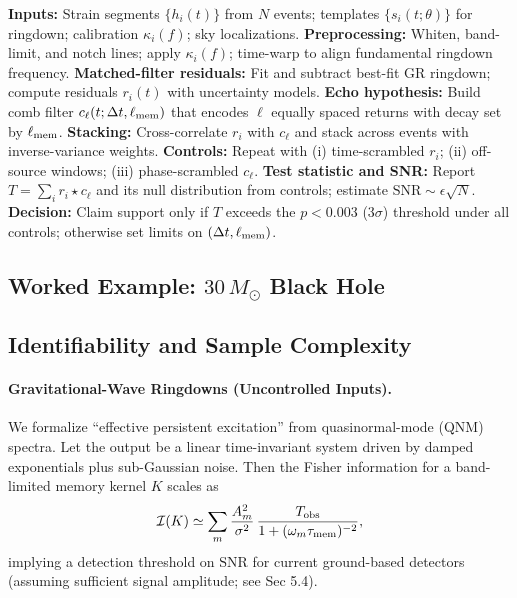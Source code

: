 \documentclass[a4paper,11pt]{article}
\theoremstyle{plain}
\theoremstyle{definition}
\theoremstyle{remark}
\begin{document}
\begin{algorithm}[tbp]
\caption{Echo-stacking protocol with nuisance controls}
\label{alg:echo-stack}
\begin{algorithmic}[1]
\State \textbf{Inputs:} Strain segments $\{h_i(t)\}$ from $N$ events; templates $\{s_i(t;\theta)\}$ for ringdown; calibration $\kappa_i(f)$; sky localizations.
\State \textbf{Preprocessing:} Whiten, band-limit, and notch lines; apply $\kappa_i(f)$; time-warp to align fundamental ringdown frequency.
\State \textbf{Matched-filter residuals:} Fit and subtract best-fit GR ringdown; compute residuals $r_i(t)$ with uncertainty models.
\State \textbf{Echo hypothesis:} Build comb filter $c_\ell(t;\Delta t,\ell_{\rm mem})$ that encodes $\ell$ equally spaced returns with decay set by $\ell_{\rm mem}$.
\State \textbf{Stacking:} Cross-correlate $r_i$ with $c_\ell$ and stack across events with inverse-variance weights.
\State \textbf{Controls:} Repeat with (i) time-scrambled $r_i$; (ii) off-source windows; (iii) phase-scrambled $c_\ell$.
\State \textbf{Test statistic and SNR:} Report $T=\sum_i r_i\star c_\ell$ and its null distribution from controls; estimate $\mathrm{SNR}\sim \epsilon\sqrt{N}$.
\State \textbf{Decision:} Claim support only if $T$ exceeds the $p<0.003$ (3$\sigma$) threshold under all controls; otherwise set limits on $(\Delta t,\ell_{\rm mem})$.
\end{algorithmic}
\end{algorithm}


\subsection{Worked Example: \texorpdfstring{$30\,M_\odot$}{30 solar-mass} Black Hole}

\subsection{Identifiability and Sample Complexity}

\paragraph{Gravitational-Wave Ringdowns (Uncontrolled Inputs).}
We formalize ``effective persistent excitation'' from quasinormal-mode (QNM) spectra. Let the output be a linear time-invariant system driven by damped exponentials plus sub-Gaussian noise. Then the Fisher information for a band-limited memory kernel $K$ scales as
\begin{align}
\mathcal{I}(K) \simeq \sum_{m} \frac{A_m^2}{\sigma^2}\,\frac{T_{\mathrm{obs}}}{1+(\omega_m\tau_{\rm mem})^{-2}},
\end{align}
implying a detection threshold on $\mathrm{SNR}$ for current ground-based detectors (assuming sufficient signal amplitude; see Sec 5.4).
\end{document}
